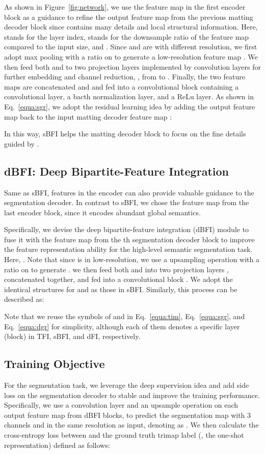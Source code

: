 \documentclass[sigconf]{acmart}
\begin{document}
As shown in Figure~\ref{fig:network}, we use the feature map  in the first encoder block as a guidance to refine the output feature map  from the previous matting decoder block since  contains many details and local structural information. Here,  stands for the layer index,  stands for the downsample ratio of the feature map compared to the input size, and . Since  and  are with different resolution, we first adopt max pooling  with a ratio  on  to generate a low-resolution feature map . We then feed both  and  to two projection layers  implemented by  convolution layers for further embedding and channel reduction, , from  to . Finally, the two feature maps are concatenated and and fed into a convolutional block  containing a  convolutional layer, a bacth normalization layer, and a ReLu layer. As shown in Eq.~\ref{equa:sgr}, we adopt the residual learning idea by adding the output feature map back to the input matting decoder feature map :

In this way, sBFI helps the matting decoder block to focus on the fine details guided by .

\subsection{dBFI: Deep Bipartite-Feature Integration}
Same as sBFI, features in the encoder can also provide valuable guidance to the segmentation decoder. In contrast to sBFI, we chose the feature map  from the last encoder block, since it encodes abundant global semantics. 

Specifically, we devise the deep bipartite-feature integration (dBFI) module to fuse it with the feature map  from the th segmentation decoder block to improve the feature representation ability for the high-level semantic segmentation task. Here, . Note that since  is in low-resolution, we use a upsampling operation  with a ratio  on  to generate . we then feed both  and  into two projection layers , concatenated together, and fed into a convolutional block . We adopt the identical structures for  and  as those in sBFI. Similarly, this process can be described as: 

Note that we reuse the symbols of  and  in Eq.~\ref{equa:tim}, Eq.~\ref{equa:sgr}, and Eq.~\ref{equa:dgr} for simplicity, although each of them denotes a specific layer (block) in TFI, sBFI, and dFI, respectively.

\subsection{Training Objective}
For the segmentation task, we leverage the deep supervision idea and add side loss on the segmentation decoder to stable and improve the training performance. Specifically, we use a  convolution layer and an upsample operation on each output feature map  from dBFI blocks, to predict the segmentation map with 3 channels and in the same resolution as input, denoting as . 
We then calculate the cross-entropy loss  between  and the ground truth trimap label  (, the one-shot representation) defined as follows:
\end{document}
